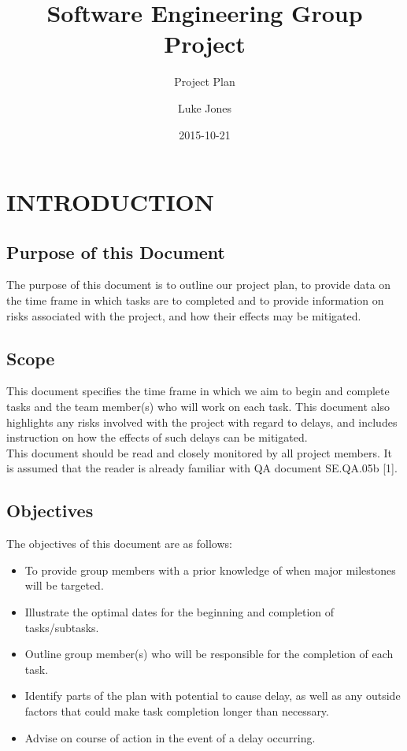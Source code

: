 \documentclass{project}
\begin{document}
\title{Software Engineering Group Project}
\subtitle{Project Plan}
\author{Luke Jones}     
\date{2015-10-21}
\maketitle
\tableofcontents
\newpage
\section{INTRODUCTION}
\subsection{Purpose of this Document}
The purpose of this document is to outline our project plan, to provide data on the time frame in which tasks are to completed and to provide information on risks associated with the project, and how their effects may be mitigated.
\subsection{Scope}
This document specifies the time frame in which we aim to begin and complete tasks and the team member(s) who will work on each task. This document also highlights any risks involved with the project with regard to delays, and includes instruction on how the effects of such delays can be mitigated.
\\[1\baselineskip]This document should be read and closely monitored by all project members. It is assumed that the reader is already familiar with QA document SE.QA.05b [1].
\subsection{Objectives}
The objectives of this document are as follows:
\begin {itemize}
	\item To provide group members with a prior knowledge of when major milestones will be targeted.
	\item Illustrate the optimal dates for the beginning and completion of tasks/subtasks.
	\item Outline group member(s) who will be responsible for the completion of each task.
	\item Identify parts of the plan with potential to cause delay, as well as any outside factors that could make task completion longer than necessary.
	\item Advise on course of action in the event of a delay occurring.
\end {itemize}	
\newpage
\end{document}
